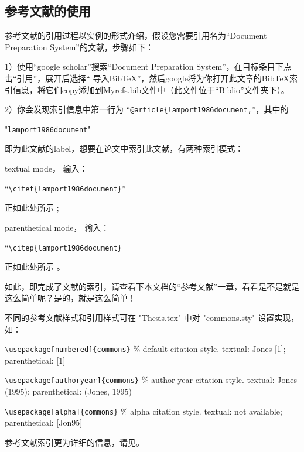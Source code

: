 \subsection{参考文献的使用}

参考文献的引用过程以实例的形式介绍，假设您需要引用名为“Document Preparation System”的文献，步骤如下：

1）使用“google scholar”搜索“Document Preparation System”，在目标条目下点击“引用”，展开后选择“ 导入BibTeX”，然后google将为你打开此文章的BibTeX索引信息，将它们copy添加到Myrefs.bib文件中（此文件位于“Biblio”文件夹下）。

2）你会发现索引信息中第一行为 “\verb|@article{lamport1986document,|”，其中的 
    
    "\verb|lamport1986document|" 
    
即为此文献的label，想要在论文中索引此文献，有两种索引模式：

textual mode， 输入：

“\verb|\citet{lamport1986document}|”

正如此处所示 \citet{lamport1986document}; 

parenthetical mode， 输入：

“\verb|\citep{lamport1986document}|

正如此处所示 \citep{lamport1986document}。

如此，即完成了文献的索引，请查看下本文档的“参考文献”一章，看看是不是就是这么简单呢？是的，就是这么简单！

不同的参考文献样式和引用样式可在 "Thesis.tex" 中对 "commons.sty" 设置实现，如：

\verb+\usepackage[numbered]{commons}+ $\%$ default citation style. textual: Jones [1]; parenthetical: [1]

\verb+\usepackage[authoryear]{commons}+ $\%$ author year citation style. textual: Jones (1995); parenthetical: (Jones, 1995)

\verb+\usepackage[alpha]{commons}+ $\%$ alpha citation style. textual: not available; parenthetical: [Jon95]

参考文献索引更为详细的信息，请见\citep{wikibook2014latex}。

\nocite{*}%
